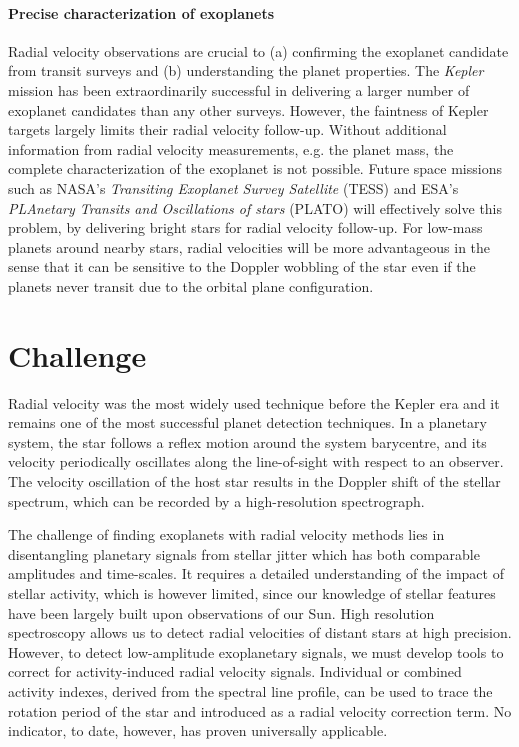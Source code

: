 \documentclass[a4paper]{article}
\begin{document}
\paragraph{Precise characterization of exoplanets}
Radial velocity observations are crucial to (a) confirming the exoplanet candidate from transit surveys and 
(b) understanding the planet properties. 
The \textit{Kepler} mission has been extraordinarily successful in delivering a larger number of exoplanet candidates 
than any other surveys. However, the faintness of Kepler targets largely limits their radial velocity follow-up. 
Without additional information from radial velocity measurements, e.g. the planet mass, the complete 
characterization of the exoplanet is not possible. Future space missions such as 
NASA's \textit{Transiting Exoplanet Survey Satellite} (TESS) \cite{Ricker2014} and 
ESA's \textit{PLAnetary Transits and Oscillations of stars} (PLATO) \cite{Rauer2014} will effectively solve this problem, 
by delivering bright stars for radial velocity follow-up. For low-mass planets around nearby stars,
radial velocities will be more advantageous in the sense that it can be sensitive to the Doppler wobbling of the 
star even if the planets never transit due to the orbital plane configuration. 

\section{Challenge}
Radial velocity was the most widely used technique before the Kepler era and it remains 
one of the most successful planet detection techniques. In a planetary system, the star follows
a reflex motion around the system barycentre, and its velocity periodically oscillates along the 
line-of-sight with respect to an observer. The velocity oscillation of the host star results in the 
Doppler shift of the stellar spectrum, which can be recorded by a high-resolution spectrograph.


The challenge of finding exoplanets with radial velocity methods lies in disentangling planetary signals from stellar jitter which has both comparable amplitudes and time-scales. It requires a detailed understanding of the impact of stellar activity, which is however limited, since our knowledge of stellar features have been largely built upon observations of our Sun. High resolution spectroscopy allows us to detect radial velocities of distant stars at high precision. However, to detect low-amplitude exoplanetary signals, we must develop tools to correct for activity-induced radial velocity signals. Individual or combined activity indexes, derived from the spectral line profile, can be used to trace the rotation period of the star and introduced as a radial velocity correction term. No indicator, to date, however, has proven universally applicable. 





\end{document}
